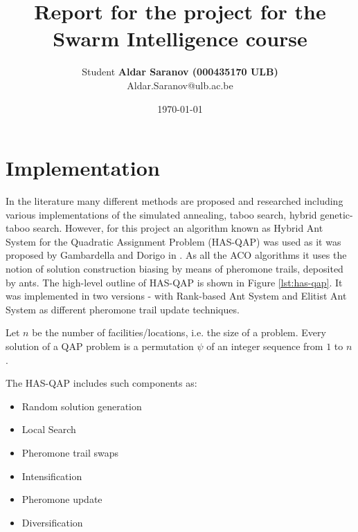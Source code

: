 \documentclass[12pt]{article}
\author{Student \textbf{Aldar Saranov (000435170 ULB)} \\ Aldar.Saranov@ulb.ac.be}
\date{\today}
\title{Report for the project for the Swarm Intelligence course}
\begin{document}
\maketitle
\newpage


\section{Implementation}

In the literature many different methods are proposed and researched including various implementations of the simulated annealing, taboo search, hybrid genetic-taboo search. However, for this project an algorithm known as Hybrid Ant System for the Quadratic Assignment Problem (HAS-QAP) was used as it was proposed by Gambardella and Dorigo in \cite{Gambardella}. As all the ACO algorithms it uses the notion of solution construction biasing by means of pheromone trails, deposited by ants. The high-level outline of HAS-QAP is shown in Figure \ref{lst:has-qap}. It was implemented in two versions - with Rank-based Ant System and Elitist Ant System as different pheromone trail update techniques.

Let $n$ be the number of facilities/locations, i.e. the size of a problem. Every solution of a QAP problem is a permutation $\psi$ of an integer sequence from $1$ to $n$.

The HAS-QAP includes such components as:

\begin{itemize}
\item Random solution generation
\item Local Search
\item Pheromone trail swaps
\item Intensification
\item Pheromone update
\item Diversification
\end{itemize}
\end{document}

